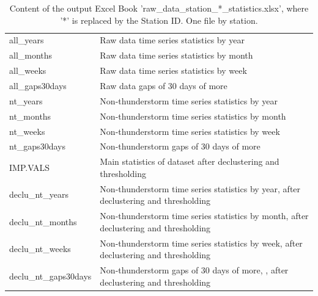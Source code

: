 \documentclass[12pt,oneside]{reedthesis}
\begin{document}
\begingroup\fontsize{8}{10}\selectfont
\begin{longtable}[t]{>{\raggedright\arraybackslash}p{1.2in}>{\raggedright\arraybackslash}p{4.6in}}
\caption[Content of raw\_data\_station\_*\_statistics.xlsx]{\label{tab:rawdatastationidstatistics}Content of the output Excel Book 'raw\_data\_station\_*\_statistics.xlsx', where '*' is replaced by the Station ID. One file by station.}\\
\toprule
\multicolumn{1}{l}{Excel Sheet Name} & \multicolumn{1}{l}{Description}\\
\midrule
all\_years & Raw data time series statistics by year\\
all\_months & Raw data time series statistics by month\\
all\_weeks & Raw data time series statistics by week\\
all\_gaps30days & Raw data gaps of 30 days of more\\
nt\_years & Non-thunderstorm time series statistics by year\\
nt\_months & Non-thunderstorm time series statistics by month\\
nt\_weeks & Non-thunderstorm time series statistics by week\\
nt\_gaps30days & Non-thunderstorm gaps of 30 days of more\\
IMP.VALS & Main statistics of dataset after declustering and thresholding\\
declu\_nt\_years & Non-thunderstorm time series statistics by year, after declustering and thresholding\\
declu\_nt\_months & Non-thunderstorm time series statistics by month, after declustering and thresholding\\
declu\_nt\_weeks & Non-thunderstorm time series statistics by week, after declustering and thresholding\\
declu\_nt\_gaps30days & Non-thunderstorm gaps of 30 days of more, , after declustering and thresholding\\
\bottomrule
\end{longtable}
\endgroup{}
\end{document}
